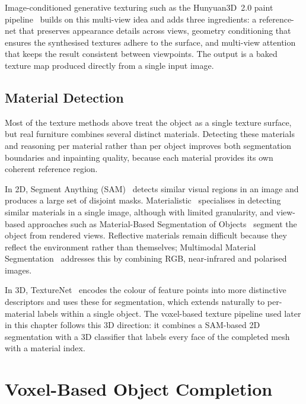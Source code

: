 Image-conditioned generative texturing such as the Hunyuan3D~2.0 paint pipeline~\cite{zhao_hunyuan3d_2025} builds on this multi-view idea and adds three ingredients: a reference-net that preserves appearance details across views, geometry conditioning that ensures the synthesised textures adhere to the surface, and multi-view attention that keeps the result consistent between viewpoints. The output is a baked texture map produced directly from a single input image.


\subsection{Material Detection}
\label{sec:7_rw_material}

Most of the texture methods above treat the object as a single texture surface, but real furniture combines several distinct materials. Detecting these materials and reasoning per material rather than per object improves both segmentation boundaries and inpainting quality, because each material provides its own coherent reference region.

In 2D, Segment Anything (SAM)~\cite{kirillov_segment_2023} detects similar visual regions in an image and produces a large set of disjoint masks. Materialistic~\cite{sharma_materialistic_2023} specialises in detecting similar materials in a single image, although with limited granularity, and view-based approaches such as Material-Based Segmentation of Objects~\cite{stets_material-based_2019} segment the object from rendered views. Reflective materials remain difficult because they reflect the environment rather than themselves; Multimodal Material Segmentation~\cite{liang_multimodal_nodate} addresses this by combining RGB, near-infrared and polarised images.

In 3D, TextureNet~\cite{huang_texturenet_2018} encodes the colour of feature points into more distinctive descriptors and uses these for segmentation, which extends naturally to per-material labels within a single object. The voxel-based texture pipeline used later in this chapter follows this 3D direction: it combines a SAM-based 2D segmentation with a 3D classifier that labels every face of the completed mesh with a material index.


\section{Voxel-Based Object Completion}
\label{sec:7_voxel}

